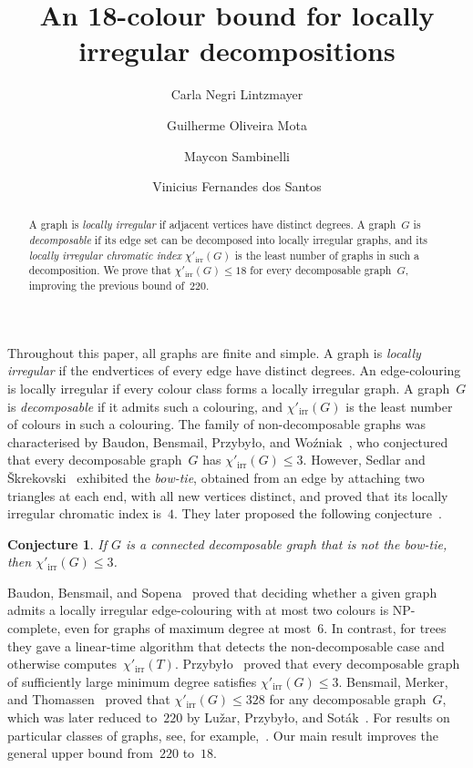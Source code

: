 \documentclass[12pt,reqno,a4paper]{amsart}
\title{An 18-colour bound for locally irregular decompositions}
\author[C.~N.~Lintzmayer]{Carla Negri Lintzmayer}
\author[G.~O.~Mota]{Guilherme Oliveira Mota}
\author[M.~Sambinelli]{Maycon Sambinelli}
\author[V.~F.~dos Santos]{Vinicius Fernandes dos Santos}
\date{}
\makeatletter
\newtheorem{conjecture}[theorem]{Conjecture}
\let\origsection=\section %
\def\section{\@ifstar{\origsection*}{\mysection}}
\def\mysection{\@startsection{section}{1}\z@{.7\linespacing\@plus\linespacing}{.5\linespacing}{\normalfont\scshape\centering\S}}
\newcommand{\lir}{\chi'_{\mathrm{irr}}}
\makeatother
\begin{document}
\begin{abstract}
  A graph is \emph{locally irregular} if adjacent vertices have distinct
  degrees. A graph~$G$ is \emph{decomposable} if its edge set can be decomposed
  into locally irregular graphs, and its \emph{locally irregular chromatic
  index} $\lir(G)$ is the least number of graphs in such a decomposition. We
  prove that $\lir(G)\le18$ for every decomposable graph~$G$, improving the
  previous bound of~$220$.
\end{abstract}

\maketitle

\section{Introduction}

Throughout this paper, all graphs are finite and simple. A graph is
\emph{locally irregular} if the endvertices of every edge have distinct
degrees. 
An edge-colouring is locally irregular if every colour class forms a locally
irregular graph. 
A graph~$G$ is \emph{decomposable} if it admits such a colouring, and $\lir(G)$
is the least number of colours in such a colouring. 
The family of non-decomposable graphs was characterised by Baudon, Bensmail,
Przyby{\l}o, and Wo{\'z}niak~\cite{BaBePrWo15}, who conjectured that every
decomposable graph~$G$ has $\lir(G)\le3$.
However, Sedlar and \v{S}krekovski~\cite{SeSk21} exhibited the \emph{bow-tie},
obtained from an edge by attaching two triangles at each end, with all new
vertices distinct, and proved that its locally irregular chromatic index
is~$4$.
They later proposed the following conjecture~\cite{SeSk24}.

\begin{conjecture}\label{conj:main}
  If $G$ is a connected decomposable graph that is not the bow-tie, then
  $\lir(G) \le 3$.
\end{conjecture}

Baudon, Bensmail, and Sopena~\cite{BaBeSo15} proved that deciding whether a
given graph admits a locally irregular edge-colouring with at most two colours
is NP-complete, even for graphs of maximum degree at most~$6$. 
In contrast, for trees they gave a linear-time algorithm that detects the
non-decomposable case and otherwise computes~$\lir(T)$. 
Przyby{\l}o~\cite{Pr16} proved that every decomposable graph of sufficiently
large minimum degree satisfies $\lir(G) \le 3$. 
Bensmail, Merker, and Thomassen~\cite{BeMeTh17} proved that $\lir(G) \le 328$
for any decomposable graph~$G$, which was later reduced to~$220$ by Lu\v{z}ar,
Przyby{\l}o, and Sot\'ak~\cite{LuPrSo18}. 
For results on particular classes of graphs, see, for
example,~\cite{BeDrNi20,LeLiShZh22,LiMoSa21,LuMaRiSoSrSt23,Pr24,SeSk24}. 
Our main result improves the general upper bound from~$220$ to~$18$.
\end{document}
